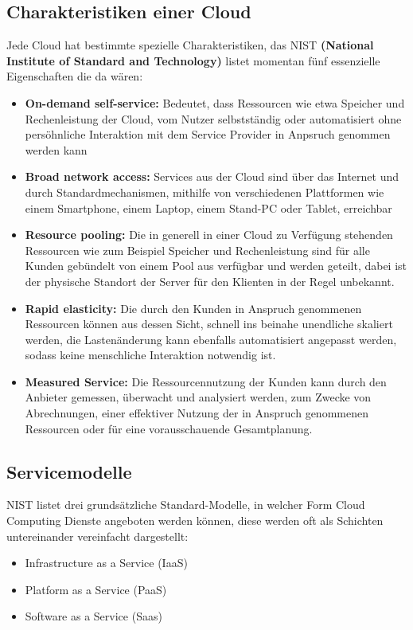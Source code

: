 \subsection{Charakteristiken einer Cloud}
Jede Cloud hat bestimmte spezielle Charakteristiken, das NIST \textbf{(National Institute of Standard and Technology)} listet
momentan fünf essenzielle Eigenschaften die da wären:
\begin{itemize}
	\item \textbf{On-demand self-service: } Bedeutet, dass Ressourcen wie etwa Speicher und Rechenleistung der Cloud, vom Nutzer selbstständig oder automatisiert 
ohne persöhnliche Interaktion mit dem Service Provider in Anpsruch genommen werden kann
	\item \textbf{Broad network access: } Services aus der Cloud sind über das Internet und durch Standardmechanismen, mithilfe von verschiedenen Plattformen
wie einem Smartphone, einem Laptop, einem Stand-PC oder Tablet, erreichbar
	\item \textbf{Resource pooling: } Die in generell in einer Cloud zu Verfügung stehenden Ressourcen wie zum Beispiel Speicher und Rechenleistung sind für alle Kunden gebündelt von einem Pool aus verfügbar und werden geteilt, dabei ist der physische Standort der Server für den Klienten in der Regel unbekannt.
	\item \textbf{Rapid elasticity: } Die durch den Kunden in Anspruch genommenen Ressourcen können aus dessen Sicht, schnell ins beinahe unendliche skaliert werden, die Lastenänderung
kann ebenfalls automatisiert angepasst werden, sodass keine menschliche Interaktion notwendig ist.
	\item \textbf{Measured Service: } Die Ressourcennutzung der Kunden kann durch den Anbieter gemessen, überwacht und analysiert werden, zum Zwecke von Abrechnungen, einer effektiver
Nutzung der in Anspruch genommenen Ressourcen oder für eine vorausschauende Gesamtplanung.
\end{itemize}


\subsection{Servicemodelle}
NIST listet drei grundsätzliche Standard-Modelle, in welcher Form Cloud Computing Dienste angeboten werden können, diese werden oft als Schichten untereinander vereinfacht dargestellt:
\begin{itemize}
	\item Infrastructure as a Service (IaaS)
	\item Platform as a Service (PaaS)
	\item Software as a Service (Saas)
\end{itemize}


